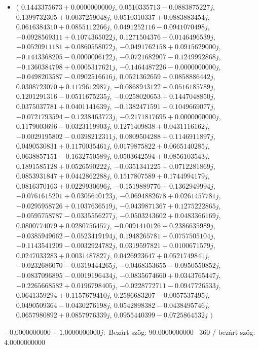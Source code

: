 \documentclass[14pt,a4paper]{article}
\begin{document}
\begin{itemize}
\item
$\big($
$0.1443375673+0.0000000000j$, $0.0510335713-0.0883875227j$, $0.1399732305+0.0037259048j$, $0.0510310337+0.0883883454j$, $0.0616384310+0.0855112266j$, $0.0491252116-0.0941070498j$, $-0.0928569311+0.1074365022j$, $0.1271504376-0.0146496539j$, $-0.0520911181+0.0860558072j$, $-0.0491762158+0.0915629000j$, $-0.1443368205-0.0000006122j$, $-0.0721682907-0.1249992868j$, $-0.1360384798+0.0005317621j$, $-0.1464487226-0.0000000000j$, $-0.0498203587-0.0902516616j$, $0.0521362659+0.0858886442j$, $0.0308723070+0.1179612987j$, $-0.0868943122+0.0516185789j$, $0.1201291316-0.0511675235j$, $-0.0258020653+0.1447048850j$, $0.0375037781+0.0401141639j$, $-0.1382471591+0.1049669077j$, $-0.0721793594-0.1238463773j$, $-0.2171817695+0.0000000000j$, $0.1179003696-0.0323119903j$, $0.1271409838+0.0431116162j$, $-0.0029195802-0.0398212311j$, $0.0809504288+0.1146911897j$, $0.0490530831+0.1170035461j$, $0.0179875822+0.0665140285j$, $0.0638857151-0.1632750589j$, $0.0503642594+0.0856103543j$, $0.1891585128+0.0526590222j$, $-0.0351341225+0.0712281869j$, $0.0853931847+0.0442862288j$, $0.1517807589+0.1744994179j$, $0.0816370163+0.0229930696j$, $-0.1519889776+0.1362949994j$, $-0.0761615201+0.0305640123j$, $-0.0694882678+0.0261457781j$, $-0.0295958726+0.1037636519j$, $-0.0439871367+0.1275222865j$, $-0.0595758787-0.0335556277j$, $-0.0503243602+0.0483366169j$, $0.0800774079+0.0280756457j$, $-0.0091410126-0.2386635989j$, $-0.0385949662-0.0523419194j$, $0.1948265781+0.0757505104j$, $-0.1143541209-0.0032924782j$, $0.0319597821+0.0100671579j$, $0.0247033283+0.0031487827j$, $0.0426923647+0.0521749841j$, $-0.0232686070-0.0319444265j$, $-0.0468353655-0.0950550852j$, $-0.0837096895-0.0019196434j$, $-0.0835674660+0.0343765447j$, $-0.2265668582+0.0196798405j$, $-0.0228772711-0.0947726533j$, $0.0641359294+0.1157679410j$, $0.2586683207-0.0057537495j$, $0.0490509364-0.0430276198j$, $0.0542898382-0.0438495746j$, $0.0657980892+0.0857976339j$, $0.0955440399-0.0725864532j$
$\big)$
\end{itemize}
$-0.0000000000+1.0000000000j$:\
Bezárt szög: $90.0000000000$ \
360 / bezárt szög: $4.0000000000$\
\end{document}
